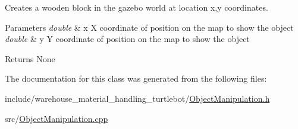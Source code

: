 Creates a wooden block in the gazebo world at location x,y coordinates. 


\begin{DoxyParams}{Parameters}
{\em double} & x X coordinate of position on the map to show the object \\
\hline
{\em double} & y Y coordinate of position on the map to show the object \\
\hline
\end{DoxyParams}
\begin{DoxyReturn}{Returns}
None 
\end{DoxyReturn}


The documentation for this class was generated from the following files\+:\begin{DoxyCompactItemize}
\item 
include/warehouse\+\_\+material\+\_\+handling\+\_\+turtlebot/\hyperlink{ObjectManipulation_8h}{Object\+Manipulation.\+h}\item 
src/\hyperlink{ObjectManipulation_8cpp}{Object\+Manipulation.\+cpp}\end{DoxyCompactItemize}
